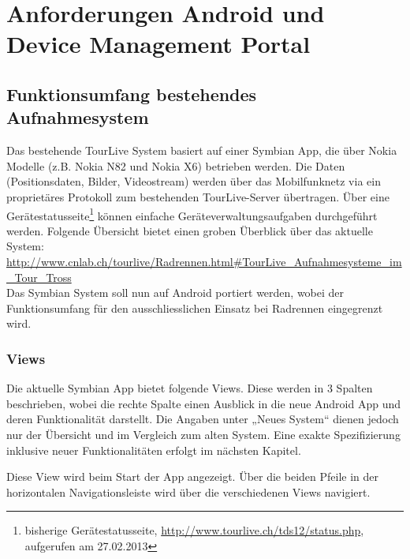 \section{Anforderungen Android und Device Management Portal}

\subsection{Funktionsumfang bestehendes Aufnahmesystem}
Das bestehende TourLive System basiert auf einer Symbian App, die über Nokia Modelle (z.B. Nokia N82 und Nokia X6) betrieben werden. Die Daten (Positionsdaten, Bilder, Videostream) werden über das Mobilfunknetz via ein proprietäres Protokoll zum bestehenden TourLive-Server übertragen. Über eine Gerätestatusseite\footnote{bisherige Gerätestatusseite, \url{http://www.tourlive.ch/tds12/status.php}, aufgerufen am 27.02.2013}   können einfache Geräteverwaltungsaufgaben durchgeführt werden. Folgende Übersicht bietet einen groben Überblick über das aktuelle System: \url{
http://www.cnlab.ch/tourlive/Radrennen.html#TourLive_Aufnahmesysteme_im_Tour_Tross} \\

Das Symbian System soll nun auf Android portiert werden, wobei der Funktionsumfang für den ausschliesslichen Einsatz bei Radrennen eingegrenzt wird. 

\subsubsection{Views}
Die aktuelle Symbian App bietet folgende Views. Diese werden in 3 Spalten beschrieben, wobei die rechte Spalte einen Ausblick in die neue Android App und deren Funktionalität darstellt. Die Angaben unter „Neues System“ dienen jedoch nur der Übersicht und im Vergleich zum alten System. Eine exakte Spezifizierung inklusive neuer Funktionalitäten erfolgt im nächsten Kapitel.

Diese View wird beim Start der App angezeigt. Über die beiden Pfeile in der horizontalen Navigationsleiste wird über die verschiedenen Views navigiert.

